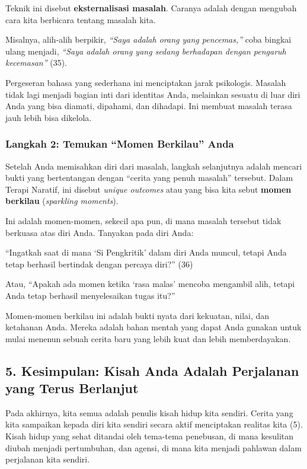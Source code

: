 \documentclass[
  letterpaper,
  DIV=11,
  numbers=noendperiod]{scrreprt}
\begin{document}
Teknik ini disebut \textbf{eksternalisasi masalah}. Caranya adalah
dengan mengubah cara kita berbicara tentang masalah kita.

Misalnya, alih-alih berpikir, \emph{``Saya adalah orang yang
pencemas,''} coba bingkai ulang menjadi, \emph{``Saya adalah orang yang
sedang berhadapan dengan pengaruh kecemasan''} (35).

Pergeseran bahasa yang sederhana ini menciptakan jarak psikologis.
Masalah tidak lagi menjadi bagian inti dari identitas Anda, melainkan
sesuatu di luar diri Anda yang bisa diamati, dipahami, dan dihadapi. Ini
membuat masalah terasa jauh lebih bisa dikelola.

\subsubsection{Langkah 2: Temukan ``Momen Berkilau''
Anda}\label{langkah-2-temukan-momen-berkilau-anda}

Setelah Anda memisahkan diri dari masalah, langkah selanjutnya adalah
mencari bukti yang bertentangan dengan ``cerita yang penuh masalah''
tersebut. Dalam Terapi Naratif, ini disebut \emph{unique outcomes} atau
yang bisa kita sebut \textbf{momen berkilau} (\emph{sparkling moments}).

Ini adalah momen-momen, sekecil apa pun, di mana masalah tersebut tidak
berkuasa atas diri Anda. Tanyakan pada diri Anda:

``Ingatkah saat di mana `Si Pengkritik' dalam diri Anda muncul, tetapi
Anda tetap berhasil bertindak dengan percaya diri?'' (36)

Atau, ``Apakah ada momen ketika `rasa malas' mencoba mengambil alih,
tetapi Anda tetap berhasil menyelesaikan tugas itu?''

Momen-momen berkilau ini adalah bukti nyata dari kekuatan, nilai, dan
ketahanan Anda. Mereka adalah bahan mentah yang dapat Anda gunakan untuk
mulai menenun sebuah cerita baru yang lebih kuat dan lebih
memberdayakan.

\subsection{\texorpdfstring{\textbf{5. Kesimpulan: Kisah Anda Adalah
Perjalanan yang Terus
Berlanjut}}{5. Kesimpulan: Kisah Anda Adalah Perjalanan yang Terus Berlanjut}}\label{kesimpulan-kisah-anda-adalah-perjalanan-yang-terus-berlanjut}

Pada akhirnya, kita semua adalah penulis kisah hidup kita sendiri.
Cerita yang kita sampaikan kepada diri kita sendiri secara aktif
menciptakan realitas kita (5). Kisah hidup yang sehat ditandai oleh
tema-tema penebusan, di mana kesulitan diubah menjadi pertumbuhan, dan
agensi, di mana kita menjadi pahlawan dalam perjalanan kita sendiri.
\end{document}

